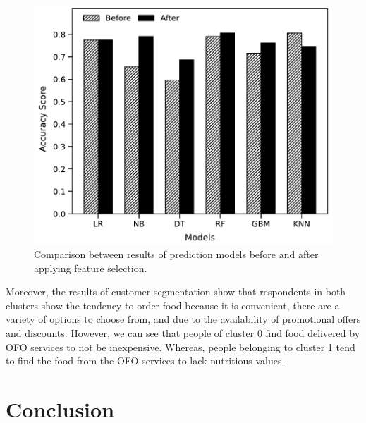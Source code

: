 \documentclass[a4paper,fleqn]{cas-sc}
\begin{document}
\begin{figure}[htb]
  \centering
  \includegraphics[width = \textwidth]{figs/accuracy_plot.pdf}
  \caption{Comparison between results of prediction models before and after applying feature selection.}
  \label{fig:compare_pred}
\end{figure}

Moreover, the results of customer segmentation show that respondents in both clusters show the tendency to order food because it is convenient, there are a variety of options to choose from, and due to the availability of promotional offers and discounts. However, we can see that people of cluster 0 find food delivered by OFO services to not be inexpensive. Whereas, people belonging to cluster 1 tend to find the food from the OFO services to lack nutritious values.

\section{Conclusion}

\end{document}
